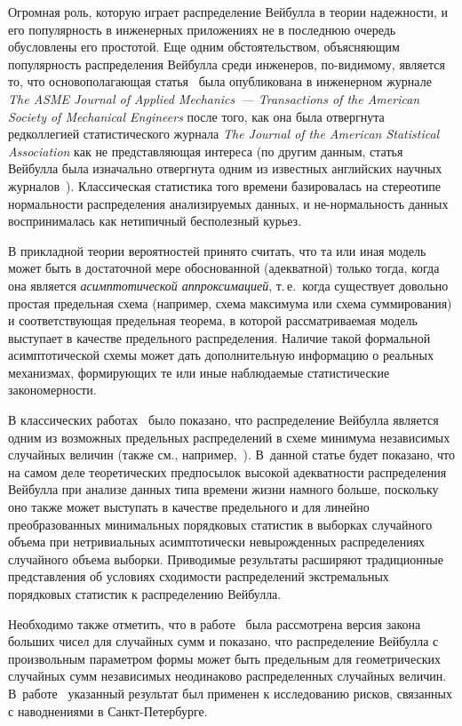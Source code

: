 \begin{multicols}{2}
Огромная роль, которую играет распределение Вейбулла в теории
надежности, и его популярность в инженерных приложениях не в
последнюю очередь обусловлены его простотой. Еще одним
обстоятельством, объясняющим популярность распределения Вейбулла
среди инженеров, по-ви\-ди\-мо\-му, является то, что основополагающая
статья~\cite{Weibull1951} была опубликована в инженерном журнале
{\it The ASME Journal of Applied Mechanics~--- Transactions of the
American Society of Mechanical Engineers} после того, как она была
отвергнута редколлегией статистического журнала {\it The Journal of
the American Statistical Association} как не представляющая интереса
(по другим данным, статья Вейбулла была изначально отвергнута одним
из известных английских научных журналов~\cite{Saunders1975}).
Классическая статистика того времени базировалась на стереотипе
нормальности распределения анализируемых данных, и не-нормальность
данных воспринималась как нетипичный бесполезный курьез.

В прикладной теории вероятностей принято считать, что та или иная
модель может быть в достаточной мере обоснованной (адекватной)
только тогда, когда она является {\it асимптотической
аппроксимацией}, т.\,е.\ когда существует довольно простая
предельная схема (например, схема максимума или схема суммирования)
и соответствующая предельная теорема, в которой рассматриваемая
модель выступает в качестве предельного распределения. Наличие такой
формальной асимптотической схемы может дать дополнительную
информацию о реальных механизмах, формирующих те или иные
наблюдаемые статистические закономерности.

В классических работах~\cite{Frechet1927,
FisherTippett1928, Gnedenko1943} было показано, что распределение
Вейбулла является одним из возможных предельных распределений в
схеме минимума независимых случайных величин (также см.,
например,~\cite{Gumbel1965, Galambos1984}). В~данной статье будет показано, что
на самом деле теоретических предпосылок высокой адекватности
распределения Вейбулла при анализе данных типа времени жизни намного
больше, поскольку оно также может выступать в качестве предельного и
для линейно преобразованных минимальных порядковых статистик в
выборках случайного объема при нетривиальных асимптотически
невырожденных распределениях случайного объема выборки. Приводимые
результаты расширяют традиционные представления об условиях
сходимости распределений экстремальных порядковых статистик к
распределению Вейбулла.

Необходимо также отметить, что в работе~\cite{GrigoryevaKorolevSokolov2013}
была рассмотрена версия закона
больших чисел для случайных сумм и показано, что распределение
Вейбулла с произвольным параметром формы может быть предельным для
геометрических случайных сумм независимых неодинаково распределенных
случайных величин. В~работе~\cite{Korolev_et_al2014} указанный
результат был применен к исследованию рисков, связанных с
наводнениями в Санкт-Пе\-тер\-бурге.


\end{multicols}
